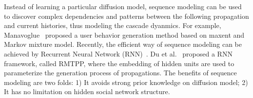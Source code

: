 % 

Instead of learning a particular diffusion model, sequence modeling can be
used to discover complex dependencies and patterns between the following
propagation and current histories, thus modeling the cascade dyanmics.
For example, Manavoglue~\cite{Manavoglu2003userbehaviormodels} proposed a user
behavior generation method based on maxent and Markov mixture model. Recently,
the efficient way of sequence modeling can be achieved by Recurrent Neural
Network
(RNN)~\cite{goldberg2014word2vec,mikolov2010recurrent,sundermeyer2012lstm}.
Du et al.~\cite{DuKDD2016} proposed a RNN framework, called RMTPP,
where the embedding of hidden units are used to parameterize the generation
process of propagations. The benefits of sequence modeling are two folds: 1)
It avoids strong prior knowledge on diffusion model; 2) It has no limitation on
hidden social network structure. 

% 

